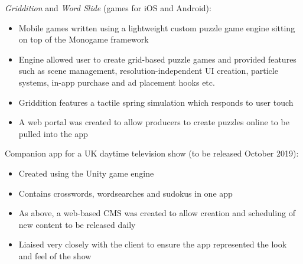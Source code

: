 \item \emph{Griddition} and \emph{Word Slide} (games for iOS and Android):
\begin{itemize}%
    \item Mobile games written using a lightweight custom puzzle game engine sitting on top of the Monogame framework
    \item Engine allowed user to create grid-based puzzle games and provided features such as scene management, resolution-independent UI creation, particle systems, in-app purchase and ad placement hooks etc.
    \item Griddition features a tactile spring simulation which responds to user touch
    \item A web portal was created to allow producers to create puzzles online to be pulled into the app
\end{itemize}
\bigbreak
\item Companion app for a UK daytime television show (to be released October 2019):
\begin{itemize}
    \item Created using the Unity game engine
    \item Contains crosswords, wordsearches and sudokus in one app
    \item As above, a web-based CMS was created to allow creation and scheduling of new content to be released daily
    \item Liaised very closely with the client to ensure the app represented the look and feel of the show
\end{itemize}
\bigbreak
